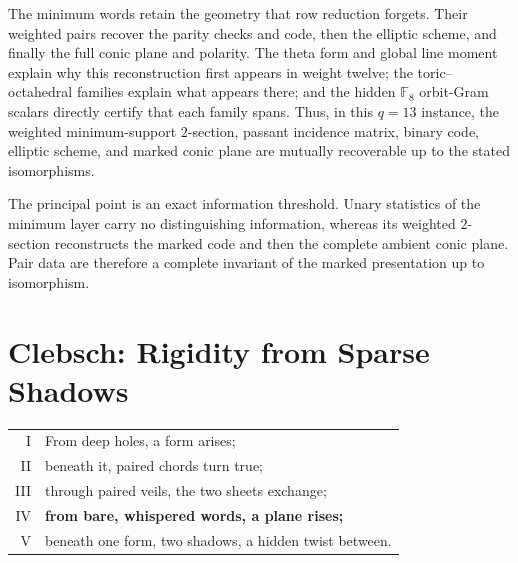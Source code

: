 \documentclass[11pt]{article}
\theoremstyle{definition}
\theoremstyle{remark}
\newcommand{\F}{\mathbb F}
\begin{document}
The minimum words retain the geometry that row reduction forgets.  Their
weighted pairs recover the parity checks and code, then the elliptic scheme,
and finally the full conic plane and polarity.  The theta form and global
line moment explain why this reconstruction first appears in weight twelve;
the toric--octahedral families explain what appears there; and the hidden
\(\F_8\) orbit-Gram scalars directly certify that each family spans.  Thus,
in this \(q=13\) instance, the weighted minimum-support \(2\)-section, passant incidence
matrix, binary code, elliptic scheme, and marked conic plane are mutually
recoverable up to the stated isomorphisms.

The principal point is an exact information threshold.  Unary statistics of
the minimum layer carry no distinguishing information, whereas its weighted
\(2\)-section reconstructs the marked code and then the complete ambient
conic plane.  Pair data are therefore a complete invariant of the marked
presentation up to isomorphism.

\clearpage
\section*{Clebsch: Rigidity from Sparse Shadows}

\begin{center}
\begin{tabular}{@{}r@{\hskip 1.4em}l@{}}
{\scriptsize I}   & From deep holes, a form arises;\\
{\scriptsize II}  & beneath it, paired chords turn true;\\
{\scriptsize III} & through paired veils, the two sheets exchange;\\
{\scriptsize IV}  & \textbf{from bare, whispered words, a plane rises;}\\
{\scriptsize V}   & beneath one form, two shadows, a hidden twist between.
\end{tabular}
\end{center}
\end{document}
